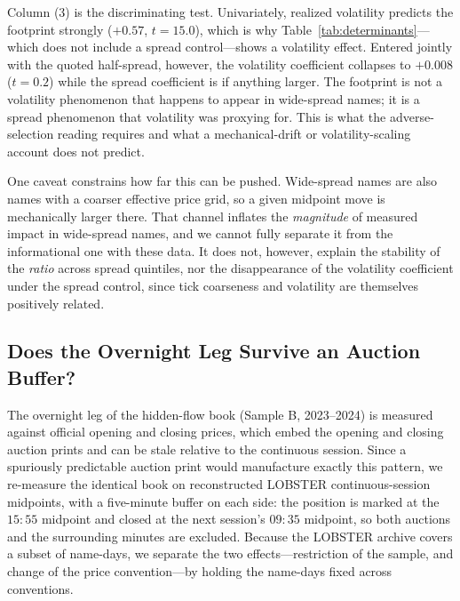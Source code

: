 \documentclass[11pt]{article}
\begin{document}
Column (3) is the discriminating test. Univariately, realized volatility predicts the
footprint strongly ($+0.57$, $t=15.0$), which is why Table~\ref{tab:determinants}---which
does not include a spread control---shows a volatility effect. Entered jointly with the
quoted half-spread, however, the volatility coefficient collapses to $+0.008$ ($t=0.2$)
while the spread coefficient is if anything larger. The footprint is not a volatility
phenomenon that happens to appear in wide-spread names; it is a spread phenomenon that
volatility was proxying for. This is what the adverse-selection reading requires and what
a mechanical-drift or volatility-scaling account does not predict.

One caveat constrains how far this can be pushed. Wide-spread names are also names with a
coarser effective price grid, so a given midpoint move is mechanically larger there. That
channel inflates the \emph{magnitude} of measured impact in wide-spread names, and we
cannot fully separate it from the informational one with these data. It does not, however,
explain the stability of the \emph{ratio} across spread quintiles, nor the disappearance of
the volatility coefficient under the spread control, since tick coarseness and volatility
are themselves positively related.

\subsection{Does the Overnight Leg Survive an Auction Buffer?}
\label{sub:buffer}

The overnight leg of the hidden-flow book (Sample B, 2023--2024) is measured against
official opening and closing prices, which embed the opening and closing auction prints and
can be stale relative to the continuous session. Since a spuriously predictable auction
print would manufacture exactly this pattern, we re-measure the identical book on
reconstructed LOBSTER continuous-session midpoints, with a five-minute buffer on each side:
the position is marked at the $15{:}55$ midpoint and closed at the next session's $09{:}35$
midpoint, so both auctions and the surrounding minutes are excluded. Because the LOBSTER
archive covers a subset of name-days, we separate the two effects---restriction of the
sample, and change of the price convention---by holding the name-days fixed across
conventions.
\end{document}
